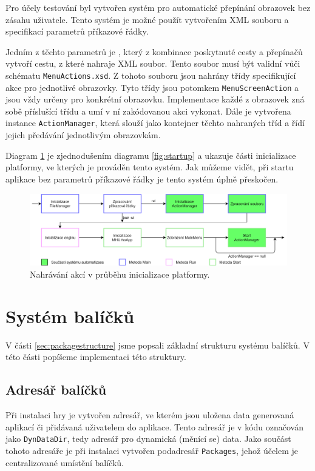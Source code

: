 Pro účely testování byl vytvořen systém pro automatické přepínání obrazovek bez zásahu uživatele. Tento systém je možné použít vytvořením XML souboru a specifikací parametrů příkazové řádky.

Jedním z těchto parametrů je , který z kombinace poskytnuté cesty a přepínačů  vytvoří cestu, z které nahraje XML soubor. Tento soubor musí být validní vůči schématu \texttt{MenuActions.xsd}. Z tohoto souboru jsou  nahrány třídy specifikující akce pro jednotlivé obrazovky. Tyto třídy jsou potomkem \texttt{MenuScreenAction} a jsou vždy určeny pro konkrétní obrazovku. Implementace každé z obrazovek zná sobě příslušící třídu a umí v ní zakódovanou akci vykonat. Dále je vytvořena instance \texttt{ActionManager}, která slouží jako kontejner těchto nahraných tříd a řídí jejich předávání jednotlivým obrazovkám.

Diagram \ref{fig:uiautomationload} je zjednodušením diagramu \ref{fig:startup} a ukazuje části inicializace platformy, ve kterých je prováděn tento systém. Jak můžeme vidět, při startu aplikace bez parametrů příkazové řádky je tento systém úplně přeskočen. 

\begin{figure}[h]
	\centering
	\includegraphics[width=\textwidth]{img/MenuActions.png}
	\caption{Nahrávání akcí v průběhu inicializace platformy.}
	\label{fig:uiautomationload}
\end{figure}



\section{Systém balíčků}
V části \ref{sec:packagestructure} jsme popsali základní strukturu systému balíčků. V této části popíšeme implementaci této struktury.

\subsection{Adresář balíčků}
\label{sec:packagedir}
Při instalaci hry je vytvořen adresář, ve kterém jsou uložena data generovaná aplikací či přidávaná uživatelem do aplikace. Tento adresář je v kódu označován jako \texttt{DynDataDir}, tedy adresář pro dynamická (měnící se) data. Jako součást tohoto adresáře je při instalaci vytvořen podadresář \texttt{Packages}, jehož účelem je centralizované umístění balíčků.


